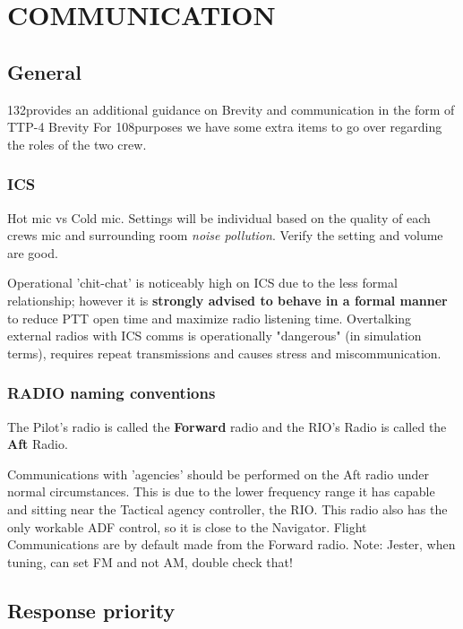 \section{COMMUNICATION}

\subsection{General}

132\nd provides an additional guidance on Brevity and communication in the form
of TTP-4 Brevity For 108\th purposes we have some extra items to go over
regarding the roles of the two crew.

\subsubsection{ICS}

Hot mic vs Cold mic. Settings will be individual based on the quality of each
crews mic and surrounding room \textit{noise pollution}. Verify the setting and
volume are good.

Operational 'chit-chat' is noticeably high on ICS due to the less formal
relationship; however it is \textbf{strongly advised to behave in a formal
manner} to reduce PTT open time and maximize radio listening time. Overtalking
external radios with ICS comms is operationally "dangerous" (in simulation
terms), requires repeat transmissions and causes stress and miscommunication.

\subsubsection{RADIO naming conventions}

The Pilot's radio is called the \textbf{Forward} radio and the RIO's Radio is
called the \textbf{Aft} Radio.

Communications with 'agencies' should be performed on the Aft radio under
normal circumstances. This is due to the lower frequency range it has capable
and sitting near the Tactical agency controller, the RIO. This radio also has
the only workable ADF control, so it is close to the Navigator. Flight
Communications are by default made from the Forward radio. Note: Jester, when
tuning, can set FM and not AM, double check that!

\subsection{Response priority}

